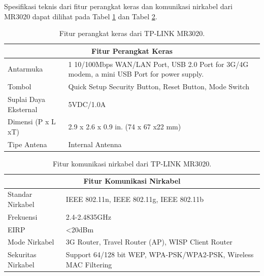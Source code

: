    Spesifikasi teknis dari fitur perangkat keras dan komunikasi nirkabel dari MR3020 dapat dilihat pada Tabel \ref{mr3020-hardware-feature} dan Tabel \ref{mr3020-wireless-feature}.

    \begin{table}[ht!]
    \centering
    \caption{Fitur perangkat keras dari TP-LINK MR3020.}
    \label{mr3020-hardware-feature}
    \begin{tabular}{|l|p{10cm}|}
    \hline
    \multicolumn{2}{|c|}{Fitur Perangkat Keras}                                                                                                \\ \hline
    Antarmuka             & 1 10/100Mbps WAN/LAN Port, USB 2.0 Port for 3G/4G modem, a mini USB Port for power supply.   \\ \hline
    Tombol                & Quick Setup Security Button, Reset Button, Mode Switch                                                             \\ \hline
    Suplai Daya Eksternal & 5VDC/1.0A                                                                                                          \\ \hline
    Dimensi (P x L xT)    & 2.9 x 2.6 x 0.9 in. (74 x 67 x22 mm)                                                                               \\ \hline
    Tipe Antena           & Internal Antenna                                                                                                   \\ \hline
    \end{tabular}
    \end{table}

    \begin{table}[ht!]
    \centering
    \caption{Fitur komunikasi nirkabel dari TP-LINK MR3020.}
    \label{mr3020-wireless-feature}
    \begin{tabular}{|l|p{10cm}|}
    \hline
    \multicolumn{2}{|c|}{Fitur Komunikasi Nirkabel}                                         \\ \hline
    Standar Nirkabel   & IEEE 802.11n, IEEE 802.11g, IEEE 802.11b                           \\ \hline
    Frekuensi          & 2.4-2.4835GHz                                                      \\ \hline
    EIRP               & <20dBm                                                             \\ \hline
    Mode Nirkabel      & 3G Router, Travel Router (AP), WISP Client Router                  \\ \hline
    Sekuritas Nirkabel & Support 64/128 bit WEP, WPA-PSK/WPA2-PSK, Wireless MAC Filtering   \\ \hline
    \end{tabular}
    \end{table}

